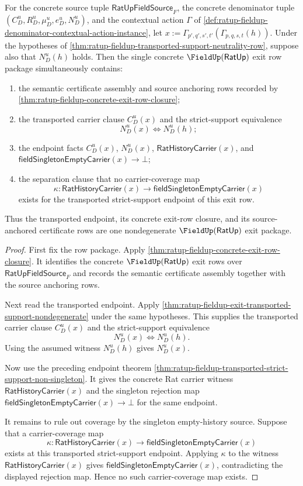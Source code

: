 \begin{theorem}
\label{thm:ratup-fieldup-transported-exit-row-nondegenerate-closure}
For the concrete source tuple $\mathsf{RatUpFieldSource}_F$, the concrete
denominator tuple $(C_D^u,R_D^u,\mu_D^u,e_D^u,N_D^u)$, and the contextual
action $\Gamma$ of
\autoref{def:ratup-fieldup-denominator-contextual-action-instance}, let
$x:=\Gamma_{p',q',s',t'}(\Gamma_{p,q,s,t}(h))$. Under the hypotheses of
\autoref{thm:ratup-fieldup-transported-support-neutrality-row}, suppose also
that $N_D^u(h)$ holds. Then the single concrete
$\FieldUp(\mathsf{RatUp})$ exit row package simultaneously contains:
\begin{enumerate}
  \item the semantic certificate assembly and source anchoring rows recorded by
  \autoref{thm:ratup-fieldup-concrete-exit-row-closure};
  \item the transported carrier clause $C_D^u(x)$ and the strict-support
  equivalence
  $$
  N_D^u(x)\Longleftrightarrow N_D^u(h);
  $$
  \item the endpoint facts $C_D^u(x)$, $N_D^u(x)$,
  $\mathsf{RatHistoryCarrier}(x)$, and
  $\mathsf{fieldSingletonEmptyCarrier}(x)\to\bot$;
  \item the separation clause that no carrier-coverage map
  $$
  \kappa:\mathsf{RatHistoryCarrier}(x)\to
  \mathsf{fieldSingletonEmptyCarrier}(x)
  $$
  exists for the transported strict-support endpoint of this exit row.
\end{enumerate}
Thus the transported endpoint, its concrete exit-row closure, and its
source-anchored certificate rows are one nondegenerate
$\FieldUp(\mathsf{RatUp})$ exit package.
\end{theorem}
\begin{proof}
First fix the row package. Apply
\autoref{thm:ratup-fieldup-concrete-exit-row-closure}. It identifies the
concrete $\FieldUp(\mathsf{RatUp})$ exit rows over
$\mathsf{RatUpFieldSource}_F$ and records the semantic certificate assembly
together with the source anchoring rows.

Next read the transported endpoint. Apply
\autoref{thm:ratup-fieldup-exit-transported-support-nondegenerate} under the
same hypotheses. This supplies the transported carrier clause $C_D^u(x)$ and
the strict-support equivalence
$$
N_D^u(x)\Longleftrightarrow N_D^u(h).
$$
Using the assumed witness $N_D^u(h)$ gives $N_D^u(x)$.

Now use the preceding endpoint theorem
\autoref{thm:ratup-fieldup-transported-strict-support-non-singleton}. It gives
the concrete Rat carrier witness $\mathsf{RatHistoryCarrier}(x)$ and the
singleton rejection map
$\mathsf{fieldSingletonEmptyCarrier}(x)\to\bot$ for the same endpoint.

It remains to rule out coverage by the singleton empty-history source. Suppose
that a carrier-coverage map
$$
\kappa:\mathsf{RatHistoryCarrier}(x)\to
\mathsf{fieldSingletonEmptyCarrier}(x)
$$
exists at this transported strict-support endpoint. Applying $\kappa$ to the
witness $\mathsf{RatHistoryCarrier}(x)$ gives
$\mathsf{fieldSingletonEmptyCarrier}(x)$, contradicting the displayed rejection
map. Hence no such carrier-coverage map exists.
\end{proof}
